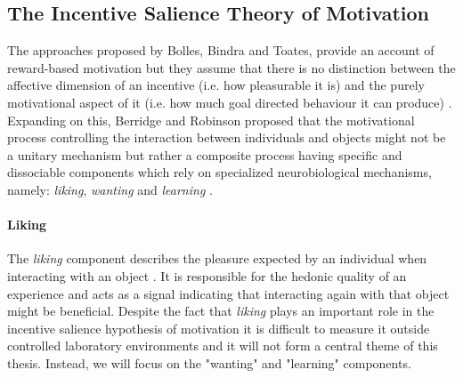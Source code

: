 \subsection{The Incentive Salience Theory of Motivation}
\label{incentive_salience}
The approaches proposed by Bolles, Bindra and Toates,  provide an account of reward-based motivation but they assume that there is no distinction between the affective dimension of an incentive (i.e. how pleasurable it is) and the purely motivational aspect of it (i.e. how much goal directed behaviour it can produce) \cite{bindra1978adaptive,toates1994comparing}. Expanding on this, Berridge and Robinson proposed that the motivational process controlling the interaction between individuals and objects might not be a unitary mechanism but rather a composite process having specific and dissociable components which rely on specialized neurobiological mechanisms, namely: \emph{liking}, \emph{wanting} and \emph{learning} \cite{berridge1998role,berridge2009dissecting,smith2011disentangling}.

\paragraph*{Liking}
\label{liking}
The \emph{liking} component describes the pleasure expected by an individual when interacting with an object \cite{berridge2009dissecting}. It is responsible for the hedonic quality of an experience and acts as a signal indicating that interacting again with that object might be beneficial. Despite the fact that \emph{liking} plays an important role in the incentive salience hypothesis of motivation it is difficult to measure it outside controlled laboratory environments \cite{berridge1998role} and it will not form a central theme of this thesis. Instead, we will focus on the "wanting" and "learning" components.

